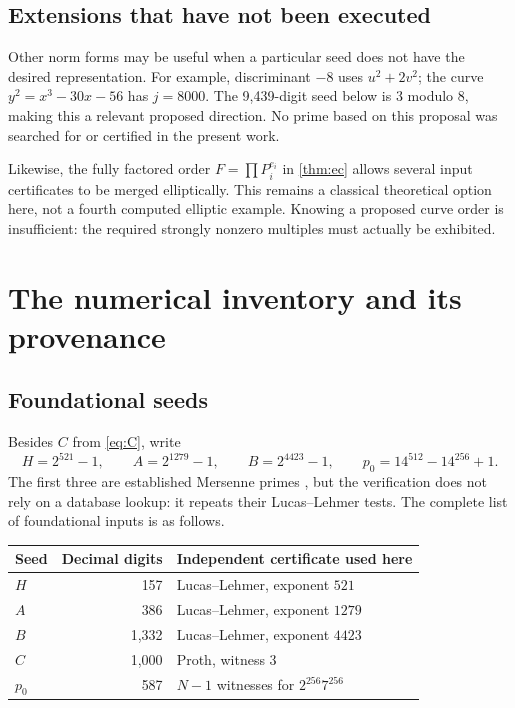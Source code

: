 \documentclass[11pt,a4paper]{article}
\theoremstyle{definition}\newtheorem{definition}[theorem]{Definition}
\theoremstyle{remark}\newtheorem{remark}[theorem]{Remark}
\begin{document}
\subsection{Extensions that have not been executed}

Other norm forms may be useful when a particular seed does not have the
desired representation. For example, discriminant $-8$ uses $u^2+2v^2$;
the curve $y^2=x^3-30x-56$ has $j=8000$. The 9,439-digit seed below is
$3$ modulo $8$, making this a relevant proposed direction. No prime based
on this proposal was searched for or certified in the present work.

Likewise, the fully factored order $F=\prod P_i^{e_i}$ in \cref{thm:ec}
allows several input certificates to be merged elliptically. This remains a
classical theoretical option here, not a fourth computed elliptic example.
Knowing a proposed curve order is insufficient: the required strongly
nonzero multiples must actually be exhibited.

\section{The numerical inventory and its provenance}
\label{sec:experiments}

\subsection{Foundational seeds}

Besides $C$ from \eqref{eq:C}, write
\[
 H=2^{521}-1,\qquad A=2^{1279}-1,\qquad B=2^{4423}-1,
 \qquad p_0=14^{512}-14^{256}+1.
\]
The first three are established Mersenne primes \cite{gimps}, but the
verification does not rely on a database lookup: it repeats their
Lucas--Lehmer tests. The complete list of foundational inputs is as follows.

\begin{center}
\begin{tabular}{@{}lrl@{}}
\toprule
Seed & Decimal digits & Independent certificate used here\\
\midrule
$H$ & 157 & Lucas--Lehmer, exponent $521$\\
$A$ & 386 & Lucas--Lehmer, exponent $1279$\\
$B$ & 1,332 & Lucas--Lehmer, exponent $4423$\\
$C$ & 1,000 & Proth, witness $3$\\
$p_0$ & 587 & $N-1$ witnesses for $2^{256}7^{256}$\\
\bottomrule
\end{tabular}
\end{center}
\end{document}
